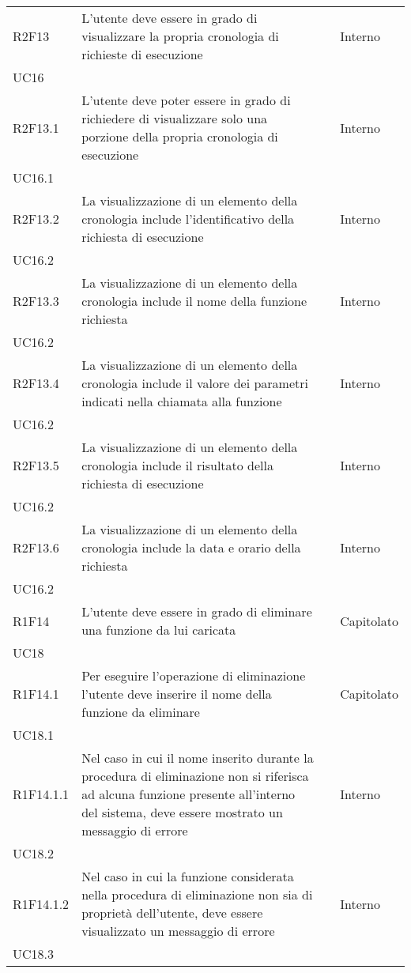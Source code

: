 \begin{longtable}{ 
		>{\centering}p{} 
		>{}p{} 
		>{\centering}p{}
		>{\centering}p{} }
	R2F13 & L'utente deve essere in grado di visualizzare la propria cronologia 
		di richieste di esecuzione 													& \de & Interno \\ UC16 \tabularnewline
	R2F13.1 & L'utente deve poter essere in grado di richiedere di visualizzare
		solo una porzione della propria cronologia di esecuzione 					& \de & Interno \\ UC16.1 \tabularnewline
	R2F13.2 & La visualizzazione di un elemento della cronologia include 
		l'identificativo della richiesta di esecuzione 								& \de & Interno \\ UC16.2 \tabularnewline
	R2F13.3 & La visualizzazione di un elemento della cronologia include 
		il nome della funzione richiesta 											& \de & Interno \\ UC16.2 \tabularnewline				
	R2F13.4 & La visualizzazione di un elemento della cronologia include 
		il valore dei parametri indicati nella chiamata alla funzione				& \de & Interno \\ UC16.2 \tabularnewline
	R2F13.5 & La visualizzazione di un elemento della cronologia include 
		il risultato della richiesta di esecuzione									& \de & Interno \\ UC16.2 \tabularnewline
	R2F13.6 & La visualizzazione di un elemento della cronologia include 
		la data e orario della richiesta 											& \de & Interno \\ UC16.2 \tabularnewline
	
	R1F14 & L'utente deve essere in grado di eliminare una funzione da lui caricata & \ob & Capitolato \\ UC18 \tabularnewline
	R1F14.1 & Per eseguire l'operazione di eliminazione l'utente deve inserire 
		il nome della funzione da eliminare 										& \ob & Capitolato \\ UC18.1 \tabularnewline
	R1F14.1.1 & Nel caso in cui il nome inserito durante la procedura di eliminazione
		non si riferisca ad alcuna funzione presente all'interno del sistema, deve 
		essere mostrato un messaggio di errore										& \ob & Interno \\ UC18.2 \tabularnewline
	R1F14.1.2 & Nel caso in cui la funzione considerata nella procedura di eliminazione
		non sia di proprietà dell'utente, deve essere visualizzato un messaggio 
		di errore																	& \ob & Interno \\ UC18.3 \tabularnewline

\end{longtable}